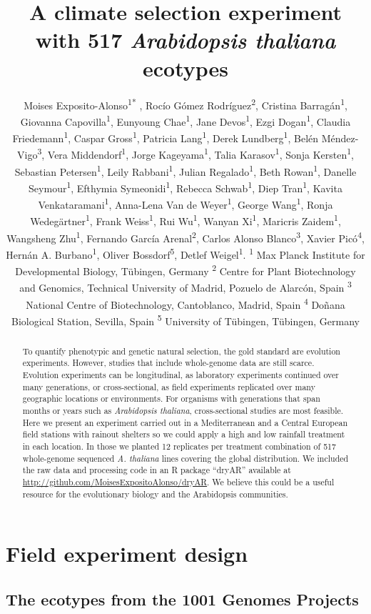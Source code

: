 \documentclass[12pt,]{article}
\title{A climate selection experiment with 517 \emph{Arabidopsis thaliana}
ecotypes}
\author{\newline \normalfont Moises
Exposito-Alonso\textsuperscript{1}\textsuperscript{*} , Rocío Gómez
Rodríguez\textsuperscript{2}, Cristina Barragán\textsuperscript{1},
Giovanna Capovilla\textsuperscript{1}, Eunyoung Chae\textsuperscript{1},
Jane Devos\textsuperscript{1}, Ezgi Dogan\textsuperscript{1}, Claudia
Friedemann\textsuperscript{1}, Caspar Gross\textsuperscript{1}, Patricia
Lang\textsuperscript{1}, Derek Lundberg\textsuperscript{1}, Belén
Méndez-Vigo\textsuperscript{3}, Vera Middendorf\textsuperscript{1},
Jorge Kageyama\textsuperscript{1}, Talia Karasov\textsuperscript{1},
Sonja Kersten\textsuperscript{1}, Sebastian Petersen\textsuperscript{1},
Leily Rabbani\textsuperscript{1}, Julian Regalado\textsuperscript{1},
Beth Rowan\textsuperscript{1}, Danelle Seymour\textsuperscript{1},
Efthymia Symeonidi\textsuperscript{1}, Rebecca
Schwab\textsuperscript{1}, Diep Tran\textsuperscript{1}, Kavita
Venkataramani\textsuperscript{1}, Anna-Lena Van de
Weyer\textsuperscript{1}, George Wang\textsuperscript{1}, Ronja
Wedegärtner\textsuperscript{1}, Frank Weiss\textsuperscript{1}, Rui
Wu\textsuperscript{1}, Wanyan Xi\textsuperscript{1}, Maricris
Zaidem\textsuperscript{1}, Wangsheng Zhu\textsuperscript{1}, Fernando
García Arenal\textsuperscript{2}, Carlos Alonso
Blanco\textsuperscript{3}, Xavier Picó\textsuperscript{4}, Hernán A.
Burbano\textsuperscript{1}, Oliver Bossdorf\textsuperscript{5}, Detlef
Weigel\textsuperscript{1}. \newline \small \newline \textsuperscript{1}
Max Planck Institute for Developmental Biology, Tübingen, Germany
\newline \textsuperscript{2} Centre for Plant Biotechnology and
Genomics, Technical University of Madrid, Pozuelo de Alarcón, Spain
\newline \textsuperscript{3} National Centre of Biotechnology,
Cantoblanco, Madrid, Spain \newline \textsuperscript{4} Doñana
Biological Station, Sevilla, Spain \newline \textsuperscript{5}
University of Tübingen, Tübingen, Germany \newline 
\newline \newline \newline \newline \newline \newline}
\date{}
\begin{document}
\maketitle
\begin{abstract}
To quantify phenotypic and genetic natural selection, the gold standard
are evolution experiments. However, studies that include whole-genome
data are still scarce. Evolution experiments can be longitudinal, as
laboratory experiments continued over many generations, or
cross-sectional, as field experiments replicated over many geographic
locations or environments. For organisms with generations that span
months or years such as \textit{Arabidopsis thaliana}, cross-sectional
studies are most feasible. Here we present an experiment carried out in
a Mediterranean and a Central European field stations with rainout
shelters so we could apply a high and low rainfall treatment in each
location. In those we planted 12 replicates per treatment combination of
517 whole-genome sequenced \textit{A. thaliana} lines covering the
global distribution. We included the raw data and processing code in an
R package ``dryAR'' available at
\url{http://github.com/MoisesExpositoAlonso/dryAR}. We believe this
could be a useful resource for the evolutionary biology and the
Arabidopsis communities.
\end{abstract}

\section{Field experiment design}\label{field-experiment-design}

\subsection{The ecotypes from the 1001 Genomes
Projects}\label{the-ecotypes-from-the-1001-genomes-projects}
\end{document}
